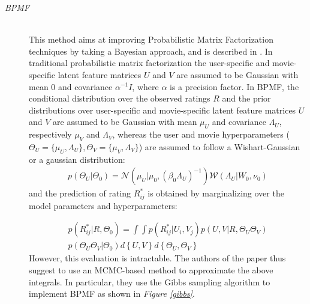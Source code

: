 \documentclass[10pt,conference,compsocconf]{IEEEtran}
\begin{document}
\begin{description}
\item[\emph{BPMF}] \ \\
This method aims at improving Probabilistic Matrix Factorization techniques by taking a Bayesian approach, and is described in \cite{BPMF}. In traditional probabilistic matrix factorization the user-specific and movie-specific latent feature matrices $U$ and $V$ are assumed to be Gaussian with mean 0 and covariance $\alpha^{-1} I$, where $\alpha$ is a precision factor.  
In BPMF, the conditional distribution over the observed ratings $R$ and the prior distributions over user-specific and movie-specific latent feature matrices $U$ and $V$ are assumed to be Gaussian with mean $\mu_{U}$ and covariance $\Lambda_{U}$, respectively $\mu_{V}$ and $\Lambda_{V}$, whereas the user and movie hyperparameters ($\Theta_{U}=\{\mu_{U},\Lambda_{U}\}, \Theta_{V}=\{\mu_{V},\Lambda_{V}\}$) are assumed to follow a Wishart-Gaussian or a gaussian distribution:
$$
\begin{aligned}
p(\Theta_{U} \vert \Theta_{0}) =  \mathcal{N}(\mu_{U} \vert \mu_{0}, (\beta_{0}\Lambda_{U})^{-1})\mathcal{W}(\Lambda_{U} \vert W_{0}, \nu_{0})
\end{aligned}
$$
and the prediction of rating $R_{ij}^*$ is obtained by marginalizing over the model parameters and hyperparameters:

$$
\begin{aligned}
p(R_{ij}^* \vert R, \Theta_0) =  \int\int p(R_{ij}^* \vert U_i,V_j)p(U,V \vert R, \Theta_U \Theta_V) \\
p(\Theta_U \Theta_V \vert \Theta_0)d \left\lbrace U,V \right\rbrace  d \left\lbrace \Theta_U, \Theta_V \right\rbrace
\end{aligned}
$$
\noindent However, this evaluation is intractable. The authors of the paper thus suggest to use an MCMC-based method to approximate the above integrals. In particular, they use the Gibbs sampling algorithm to implement BPMF as shown in \emph{Figure \ref{gibbs}}.


\end{description}
\end{document}
